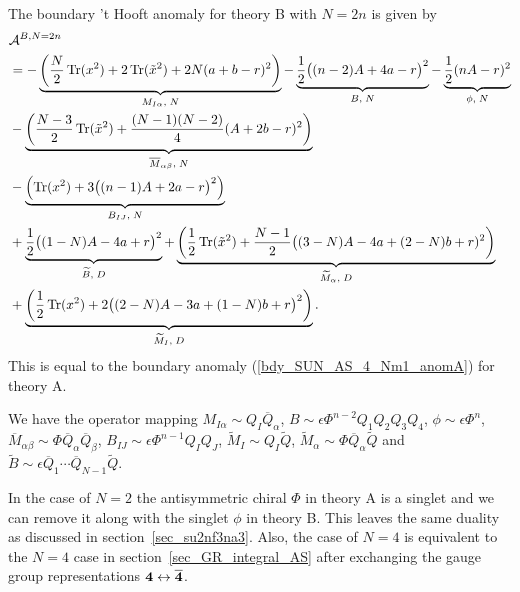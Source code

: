 \documentclass[12pt]{article}
\newcommand{\Acal}{\mathcal{A}}
\DeclareMathOperator*{\Tr}{{\rm Tr}}
\numberwithin{equation}{section}
\begin{document}
The boundary 't Hooft anomaly for theory B with $N=2n$ is given by
\begin{align}
\label{bdy_SUN_AS_4_Nm1_anomB1}
&\Acal^{B, N=2n} 
\nonumber\\
&=  - \underbrace{\left( \frac{N}{2} \Tr(x^2) + 2\Tr(\tilde{x}^2) + 2N(a+b-r)^2 \right)}_{M_{I \alpha}, \; N}
  - \underbrace{\frac{1}{2}\big( (n-2)A + 4a - r \big)^2}_{B, \; N}
  - \underbrace{\frac{1}{2}(nA-r)^2}_{\phi, \; N}
  \nonumber \\
 & - \underbrace{\left( \frac{N-3}{2} \Tr(\tilde{x}^2) + \frac{(N-1)(N-2)}{4}(A + 2b - r)^2 \right)}_{\overline{M}_{\alpha \beta}, \; N}
  \nonumber \\
 & - \underbrace{\left( \Tr(x^2) + 3\big( (n-1)A + 2a - r \big)^2 \right)}_{B_{IJ}, \; N}
   \nonumber \\
 & + \underbrace{\frac{1}{2}\big( (1-N)A - 4a + r \big)^2}_{\widetilde{B}, \; D}
 + \underbrace{\left( \frac{1}{2} \Tr(\tilde{x}^2) + \frac{N-1}{2}\big( (3-N)A - 4a +(2-N)b + r)^2 \right)}_{\widetilde{M}_{\alpha}, \; D}
  \nonumber \\
  & + \underbrace{\left( \frac{1}{2} \Tr(x^2) + 2\big( (2-N)A - 3a + (1-N)b + r \big)^2 \right)}_{\widetilde{M}_I, \; D}. 
\end{align}
This is equal to the boundary anomaly (\ref{bdy_SUN_AS_4_Nm1_anomA}) for theory A. 


We have the operator mapping $M_{I \alpha} \sim Q_I \overline{Q}_{\alpha}$, $B \sim \epsilon \Phi^{n-2} Q_1 Q_2 Q_3 Q_4$, $\phi \sim \epsilon \Phi^n$, $\overline{M}_{\alpha \beta} \sim \Phi \overline{Q}_{\alpha} \overline{Q}_{\beta}$, $B_{IJ} \sim \epsilon \Phi^{n-1} Q_I Q_J$, $\widetilde{M}_I \sim Q_I \widetilde{Q}$, $\widetilde{M}_{\alpha} \sim \Phi \overline{Q}_{\alpha} \widetilde{Q}$ and $\widetilde{B} \sim \epsilon \overline{Q}_1 \cdots \overline{Q}_{N-1} \widetilde{Q}$.

In the case of $N = 2$ the antisymmetric chiral $\Phi$ in theory A is a singlet and we can remove it along with the singlet $\phi$ in theory B. This leaves the same duality as discussed in section~\ref{sec_su2nf3na3}. Also, the case of $N = 4$ is equivalent to the $N = 4$ case in section~\ref{sec_GR_integral_AS} after exchanging the gauge group representations ${\bf 4} \leftrightarrow {\bf \overline{4}}$.
\end{document}
